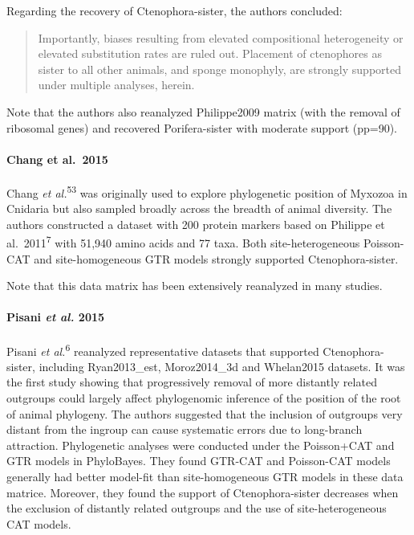 \documentclass[]{article}
\let\oldparagraph\paragraph
\renewcommand{\paragraph}[1]{\oldparagraph{#1}\mbox{}}
\begin{document}
Regarding the recovery of Ctenophora-sister, the authors concluded:

\begin{quote}
Importantly, biases resulting from elevated compositional heterogeneity
or elevated substitution rates are ruled out. Placement of ctenophores
as sister to all other animals, and sponge monophyly, are strongly
supported under multiple analyses, herein.
\end{quote}

Note that the authors also reanalyzed Philippe2009 matrix (with the
removal of ribosomal genes) and recovered Porifera-sister with moderate
support (pp=90).

\hypertarget{chang-et-al.2015}{%
\paragraph{Chang et al.~2015}\label{chang-et-al.2015}}

Chang \emph{et al.}\textsuperscript{53} was originally used to explore
phylogenetic position of Myxozoa in Cnidaria but also sampled broadly
across the breadth of animal diversity. The authors constructed a
dataset with 200 protein markers based on Philippe et
al.~2011\textsuperscript{7} with 51,940 amino acids and 77 taxa. Both
site-heterogeneous Poisson-CAT and site-homogeneous GTR models strongly
supported Ctenophora-sister.

Note that this data matrix has been extensively reanalyzed in many
studies.

\hypertarget{pisani-et-al.-2015}{%
\paragraph{\texorpdfstring{Pisani \emph{et al.}
2015}{Pisani et al. 2015}}\label{pisani-et-al.-2015}}

Pisani \emph{et al.}\textsuperscript{6} reanalyzed representative
datasets that supported Ctenophora-sister, including Ryan2013\_est,
Moroz2014\_3d and Whelan2015 datasets. It was the first study showing
that progressively removal of more distantly related outgroups could
largely affect phylogenomic inference of the position of the root of
animal phylogeny. The authors suggested that the inclusion of outgroups
very distant from the ingroup can cause systematic errors due to
long-branch attraction. Phylogenetic analyses were conducted under the
Poisson+CAT and GTR models in PhyloBayes. They found GTR-CAT and
Poisson-CAT models generally had better model-fit than site-homogeneous
GTR models in these data matrice. Moreover, they found the support of
Ctenophora-sister decreases when the exclusion of distantly related
outgroups and the use of site-heterogeneous CAT models.
\end{document}
